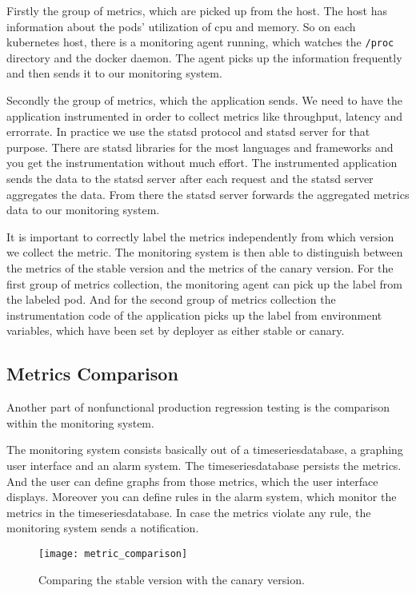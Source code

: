 Firstly the group of metrics, which are picked up from the host. The host has information
about the pods' utilization of cpu and memory. So on each kubernetes host, there is a
monitoring agent running, which watches the \verb!/proc! directory and the docker
daemon. The agent picks up the information frequently and then sends it to our monitoring
system.

Secondly the group of metrics, which the application sends. We need to have the
application instrumented in order to collect metrics like throughput, latency and
errorrate. In practice we use the statsd protocol and statsd server for that
purpose. There are statsd libraries for the most languages and frameworks and you get the
instrumentation without much effort. The instrumented application sends the data to the
statsd server after each request and the statsd server aggregates the data. From there the
statsd server forwards the aggregated metrics data to our monitoring system.

It is important to correctly label the metrics independently from which version we collect
the metric. The monitoring system is then able to distinguish between the metrics of the
stable version and the metrics of the canary version. For the first group of metrics
collection, the monitoring agent can pick up the label from the labeled pod. And for the
second group of metrics collection the instrumentation code of the application picks up
the label from environment variables, which have been set by deployer as either stable or
canary.
\subsection{Metrics Comparison}

Another part of nonfunctional production regression testing is the comparison within the
monitoring system.

The monitoring system consists basically out of a timeseriesdatabase, a graphing user
interface and an alarm system. The timeseriesdatabase persists the metrics. And the user
can define graphs from those metrics, which the user interface displays. Moreover you can
define rules in the alarm system, which monitor the metrics in the timeseriesdatabase.
In case the metrics violate any rule, the monitoring system sends a notification.

\begin{figure}[htbp]
  \centering
  \texttt{[image: metric\_comparison]}
  \caption[metric_comparison]{Comparing the stable version with the canary version.}
  \label{fig:3tierwebapp}
\end{figure}

